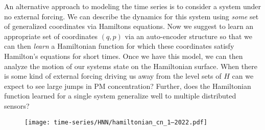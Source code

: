 An alternative approach to modeling the time series is to consider a system under no external forcing. We can describe the dynamics for this system using \textit{some} set of generalized coordinates via Hamiltons equations. Now we suggest to learn an appropriate set of coordinates $(q,p)$ via an auto-encoder structure so that we can then \textit{learn} a Hamiltonian function for which these coordinates satisfy Hamilton's equations for short times. Once we have this model, we can then analyze the motion of our systems state on the Hamiltonian surface. When there is some kind of external forcing driving us away from the level sets of $H$ can we expect to see large jumps in PM concentration? Further, does the Hamiltonian function learned for a single system generalize well to multiple distributed sensors?

\begin{figure}[h]
  \centering
  \texttt{[image: time-series/HNN/hamiltonian\_cn\_1--2022.pdf]}
\end{figure}








